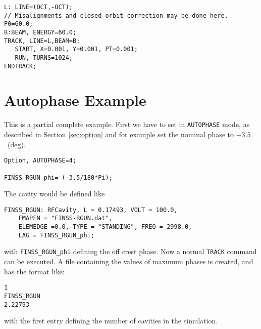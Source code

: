 \begin{verbatim}
L: LINE=(OCT,-OCT); 
// Misalignments and closed orbit correction may be done here. 
P0=60.0;
B:BEAM, ENERGY=60.0; 
TRACK, LINE=L,BEAM=B;
   START, X=0.001, Y=0.001, PT=0.001;
   RUN, TURNS=1024; 
ENDTRACK;
\end{verbatim}


\section{Autophase Example}
\label{sec:trackautoph}
This is a partial complete example. First we have to set \opal in {\tt AUTOPHASE} mode, as described in Section \ref{sec:option} and for example set the nominal phase to
$-3.5$~(deg).
\begin{verbatim}
Option, AUTOPHASE=4;

FINSS_RGUN_phi= (-3.5/180*Pi);    

\end{verbatim}
The cavity would be defined like 
\begin{verbatim}
FINSS_RGUN: RFCavity, L = 0.17493, VOLT = 100.0, 
	FMAPFN = "FINSS-RGUN.dat",
	ELEMEDGE =0.0, TYPE = "STANDING", FREQ = 2998.0,
	LAG = FINSS_RGUN_phi;
\end{verbatim}
with {\tt FINSS\_RGUN\_phi} defining the off crest phase. Now a normal {\tt TRACK} command can be executed. A file containing the values of maximum phases is created, and has the format like: 
\begin{verbatim}
1
FINSS_RGUN
2.22793
\end{verbatim}
with the first entry defining the number of cavities in the simulation.



